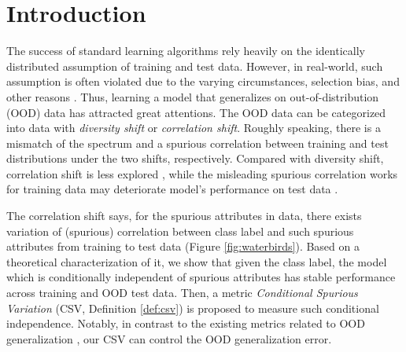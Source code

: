 \documentclass{article} %
\begin{document}
	\section{Introduction}
	The success of standard learning algorithms rely heavily on the identically distributed assumption of training and test data. However, in real-world, such assumption is often violated due to the varying circumstances, selection bias, and other reasons \citep{meinshausen2015maximin}. Thus, learning a model that generalizes on out-of-distribution (OOD) data has attracted great attentions. The OOD data \citep{ye2021ood} can be categorized into data with \emph{diversity shift} or \emph{correlation shift}. Roughly speaking, there is a mismatch of the spectrum and a spurious correlation between training and test distributions under the two shifts, respectively. Compared with diversity shift, correlation shift is less explored \citep{ye2021ood}, while the misleading spurious correlation works for training data may deteriorate model's performance on test data \citep{beery2018recognition}. %
	\par
	The correlation shift says, for the spurious attributes in data, there exists variation of (spurious) correlation between class label and such spurious attributes from training to test data (Figure \ref{fig:waterbirds}). Based on a theoretical characterization of it, we show that given the class label, the model which is conditionally independent of spurious attributes has stable performance across training and OOD test data. Then, a metric \emph{Conditional Spurious Variation} (CSV, Definition \ref{def:csv}) is proposed to measure such conditional independence. Notably, in contrast to the existing metrics related to OOD generalization \citep{hu2020domain,mahajan2021domain}, our CSV can control the OOD generalization error. 
	\par
\end{document}
